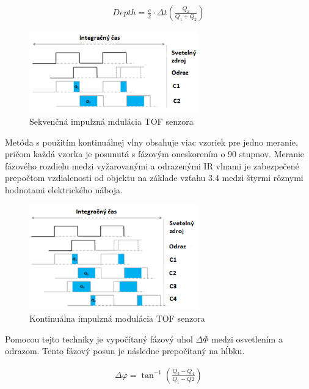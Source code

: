 \begin{equation}
\label{eq3}
\begin{aligned}
Depth=\frac{c}{2}\cdot\Delta t \left( \frac{Q_2}{Q_1 + Q_2}\right) 
\end{aligned}
\end{equation}

\begin{figure}[H]
	\centering
	\includegraphics[width=0.65\textwidth]{figures/tof_principle_a.png} 
	\caption{Sekvenčná impulzná mdulácia TOF senzora}
	\label{fig:tof_principle_a}
\end{figure}

Metóda s použitím kontinuálnej vlny obsahuje viac vzoriek pre jedno meranie, pričom každá vzorka je posunutá s fázovým oneskorením o 90 stupnov. Meranie fázového rozdielu medzi vyžarovanými a odrazenými IR vlnami je zabezpečené prepočtom vzdialenosti od objektu na základe vzťahu 3.4 medzi štyrmi rôznymi hodnotami elektrického náboja.

\begin{figure}[H]

	\centering
	\includegraphics[width=0.65\textwidth]{figures/tof_principle_b.png} 
	\caption{Kontinuálna impulzná modulácia TOF senzora}
	\label{fig:tof_principle_b}

\end{figure}

Pomocou tejto techniky je vypočítaný fázový uhol $\Delta \varPhi$ medzi osvetlením a odrazom. Tento fázový posun je následne prepočítaný na hĺbku.

\begin{equation}
\label{eq4}
\begin{aligned}
\Delta \varphi=\tan^{-1} \left( \frac{Q_3 - Q_4}{Q_1-Q2} \right) 
\end{aligned}
\end{equation}

